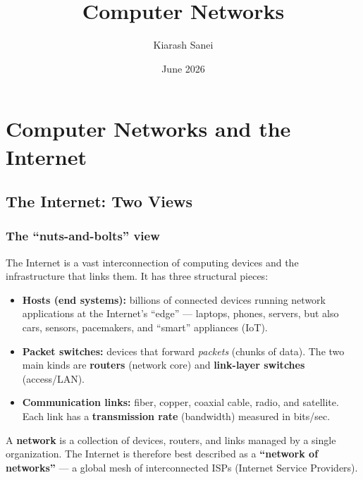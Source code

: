 \documentclass[hidelinks]{article}
\title{\color{carminered}\textbf{Computer Networks}}
\author{\color{Thistle}Kiarash Sanei}
\date{\color{SkyBlue}June 2026}
\begin{document}
\maketitle

\begin{Large}
\tableofcontents
\end{Large}

\newpage

\section{Computer Networks and the Internet}

\subsection{The Internet: Two Views}

\subsubsection{The ``nuts-and-bolts'' view}
The Internet is a vast interconnection of computing devices and the
infrastructure that links them. It has three structural pieces:

\begin{itemize}
    \item \textbf{Hosts (end systems):} billions of connected devices
    running network applications at the Internet's ``edge'' --- laptops,
    phones, servers, but also cars, sensors, pacemakers, and ``smart''
    appliances (IoT).
    \item \textbf{Packet switches:} devices that forward \emph{packets}
    (chunks of data). The two main kinds are \textbf{routers} (network
    core) and \textbf{link-layer switches} (access/LAN).
    \item \textbf{Communication links:} fiber, copper, coaxial cable,
    radio, and satellite. Each link has a \textbf{transmission rate}
    (bandwidth) measured in bits/sec.
\end{itemize}

A \textbf{network} is a collection of devices, routers, and links managed
by a single organization. The Internet is therefore best described as a
\textbf{``network of networks''} --- a global mesh of interconnected
ISPs (Internet Service Providers).
\end{document}
